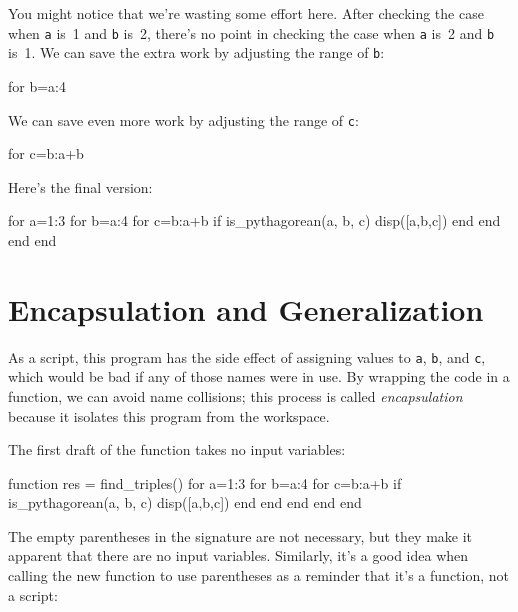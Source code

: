 You might notice that we're wasting some effort here.
After checking the case when \lstinline{a} is~1 and \lstinline{b} is~2, there's no point in checking
the case when \lstinline{a} is~2 and \lstinline{b} is~1.  We can save the extra work by adjusting the
range of \lstinline{b}:

\begin{code}
for b=a:4
\end{code}

We can save even more work by adjusting the range of \lstinline{c}:

\begin{code}
for c=b:a+b
\end{code}

Here's the final version:

\begin{code}
for a=1:3
    for b=a:4
        for c=b:a+b
            if is_pythagorean(a, b, c)
                disp([a,b,c])
            end
        end
    end
end
\end{code}

\section{Encapsulation and Generalization}

As a script, this program has the side effect of assigning values to
\lstinline{a}, \lstinline{b}, and \lstinline{c}, which would be bad if any of those names were in use.  
By wrapping the code in a function, we can avoid name collisions; this process is called \emph{encapsulation} because it isolates this program from the workspace.


The first draft of the function takes no input variables:

\begin{code}
function res = find_triples()
    for a=1:3
        for b=a:4
            for c=b:a+b
                if is_pythagorean(a, b, c)
                    disp([a,b,c])
                end
            end
        end
    end
end
\end{code}

The empty parentheses in the signature are not necessary, but
they make it apparent that there are no input variables.  Similarly,
it's a good \linebreak idea when calling the new function to use parentheses as a reminder
that it's a function, not a script:

